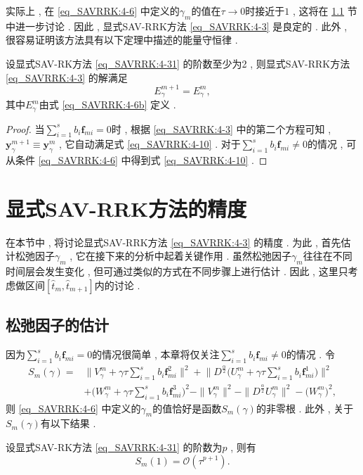 实际上 , 在 \eqref{eq_SAVRRK:4-6} 中定义的$\gamma_m$的值在$\tau\rightarrow 0$时接近于$1$ , 这将在 \ref{Section_SAVRRK: 5-1} 节中进一步讨论 . 
因此 , 显式SAV-RRK方法 \eqref{eq_SAVRRK:4-3} 是良定的 . 此外 , 很容易证明该方法具有以下定理中描述的能量守恒律 . 
\newpage
\begin{theorem}
设显式SAV-RK方法 \eqref{eq_SAVRRK:4-31} 的阶数至少为2 , 则显式SAV-RRK方法 \eqref{eq_SAVRRK:4-3} 的解满足
\begin{equation}
E_{\gamma}^{m+1}=E_{\gamma}^{m} , \label{eq_SAVRRK:4-10}
\end{equation}
其中$E_{\gamma}^{m}$由式 \eqref{eq_SAVRRK:4-6b} 定义 . 
\end{theorem}

\begin{proof}
当$\sum\limits_{i=1}^s b_i \bm{f}_{m i}=0$时 , 根据 \eqref{eq_SAVRRK:4-3} 中的第二个方程可知 , $\bm{y}_\gamma^{m+1}\equiv\bm{y}_\gamma^m$ , 它自动满足式 \eqref{eq_SAVRRK:4-10} . 
对于$\sum\limits_{i=1}^s b_i \bm{f}_{m i}\neq 0$的情况 , 可从条件 \eqref{eq_SAVRRK:4-6} 中得到式 \eqref{eq_SAVRRK:4-10} . 

\end{proof}

\section{显式SAV-RRK方法的精度}\label{Section_SAVRRK: 5}
在本节中 , 将讨论显式SAV-RRK方法 \eqref{eq_SAVRRK:4-3} 的精度 . 为此 , 首先估计松弛因子$\gamma_m$ , 它在接下来的分析中起着关键作用 . 
虽然松弛因子$\gamma_m$往往在不同时间层会发生变化 , 但可通过类似的方式在不同步骤上进行估计 . 
因此 , 这里只考虑做区间$\left[\hat{t}_m , \hat{t}_{m+1}\right]$内的讨论 . 

\subsection{松弛因子的估计}\label{Section_SAVRRK: 5-1}

因为$\sum\limits_{i=1}^s b_i \bm{f}_{m i} = 0$的情况很简单 , 本章将仅关注$\sum\limits_{i=1}^s b_i \bm{f}_{m i} \neq 0$的情况 . 
令
\begin{equation}
\begin{aligned}\label{eq_SAVRRK:sm}
S_m(\gamma)=&\big\|V_\gamma^m+\gamma \tau \sum\limits_{i=1}^s b_i \bm{f}_{m i}^2\big\|^2 + \big\|D^\frac{\alpha}{2} \big(U_\gamma^m+\gamma \tau \sum\limits_{i=1}^s b_i \bm{f}_{m i}^1\big)\big\|^2\\
&+\big(W_\gamma^m+\gamma \tau \sum\limits_{i=1}^s b_i \bm{f}_{m i}^3\big)^2-\|V_\gamma^{m}\|^2-\|D^\frac{\alpha}{2} U_\gamma^{m}\|^2-\big(W_\gamma^{m}\big)^2 , 
\end{aligned}
\end{equation}
则 \eqref{eq_SAVRRK:4-6} 中定义的$\gamma_m$的值恰好是函数$S_m(\gamma)$的非零根 . 
此外 , 关于$S_m(\gamma)$有以下结果 . 
\begin{lemma}\label{lem_SAVRRK:5_1}
设显式SAV-RK方法 \eqref{eq_SAVRRK:4-31} 的阶数为$p$ , 则有
\begin{equation}
S_m(1)=\mathcal{O}(\tau^{p+1}) . 
\end{equation}
\end{lemma}


